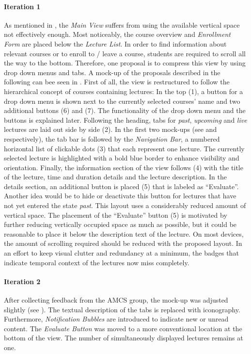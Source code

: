 \paragraph{Iteration 1}
As mentioned in , the \emph{Main View} suffers from using the available vertical space not effectively enough. Most noticeably, the course overview and \emph{Enrollment Form} are placed below the \emph{Lecture List}. In order to find information about relevant courses or to enroll to / leave a course, students are required to scroll all the way to the bottom. 
Therefore, one proposal is to compress this view by using drop down menus and tabs. A mock-up of the proposals described in the following can bee seen in . First of all, the view is restructured to follow the hierarchical concept of courses containing lectures: In the top (1), a button for a drop down menu is shown next to the currently selected courses' name and two additional buttons (6) and (7). The functionality of the drop down menu and the buttons is explained later.
Following the heading, tabs for \emph{past}, \emph{upcoming} and \emph{live} lectures are laid out side by side (2). In the first two mock-ups (see  and  respectively), the tab bar is followed by the \emph{Navigation Bar}, a numbered horizontal list of clickable dots (3) that each represent one lecture. The currently selected lecture is highlighted with a bold blue border to enhance visibility and orientation. Finally, the information section of the view follows (4) with the title of the lecture, time and duration details and the lecture description. In the details section, an additional button is placed (5) that is labeled as “Evaluate”. Another idea would be to hide or deactivate this button for lectures that have not yet entered the state \emph{past}.
This layout uses a considerably reduced amount of vertical space. The placement of the “Evaluate” button (5) is motivated by further reducing vertically occupied space as much as possible, but it could be reasonable to place it below the description text of the lecture. On most devices, the amount of scrolling required should be reduced with the proposed layout. In an effort to keep visual clutter and redundancy at a minimum, the badges that indicate temporal context of the lectures now miss completely.

\paragraph{Iteration 2}
After collecting feedback from the AMCS group, the mock-up was adjusted slightly (see ). The textual description of the tabs is replaced with iconography. Furthermore, \emph{Notification Bubbles} are introduced to indicate new or unread content. The \emph{Evaluate Button} was moved to a more conventional location at the bottom of the view. The number of simultaneously displayed lectures remains at one.

